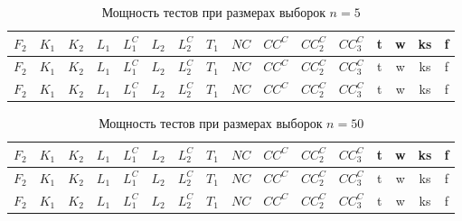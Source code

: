 \documentclass{article}
\begin{document}
\begin{longtable}{|c|c|c|c|c|c|c|c|c|c|c|c|c|c|c|c|}
  \caption{Мощность тестов при размерах выборок $n=5$}
  \label{table:n5} \\
  \hline
  $F_2$ & $K_{1}$ & $K_{2}$ & $L_{1}$ & $L_{1}^C$ & $L_{2}$ & $L_{2}^C$ & $T_1$ & $NC$ & $CC^C$ & $CC_2^C$ & $CC_3^C$ & t & w & ks & f \\ \hline
  
  
  
  
  $F_2$ & $K_{1}$ & $K_{2}$ & $L_{1}$ & $L_{1}^C$ & $L_{2}$ & $L_{2}^C$ & $T_1$ & $NC$ & $CC^C$ & $CC_2^C$ & $CC_3^C$ & t & w & ks & f \\ \hline
  
  
  
  
  $F_2$ & $K_{1}$ & $K_{2}$ & $L_{1}$ & $L_{1}^C$ & $L_{2}$ & $L_{2}^C$ & $T_1$ & $NC$ & $CC^C$ & $CC_2^C$ & $CC_3^C$ & t & w & ks & f \\ \hline
  
  
  
  
\end{longtable}

\begin{longtable}{|c|c|c|c|c|c|c|c|c|c|c|c|c|c|c|c|}
  \caption{Мощность тестов при размерах выборок $n=50$}
  \label{table:n50} \\
  \hline
  $F_2$ & $K_{1}$ & $K_{2}$ & $L_{1}$ & $L_{1}^C$ & $L_{2}$ & $L_{2}^C$ & $T_1$ & $NC$ & $CC^C$ & $CC_2^C$ & $CC_3^C$ & t & w & ks & f \\ \hline
  
  
  
  
  $F_2$ & $K_{1}$ & $K_{2}$ & $L_{1}$ & $L_{1}^C$ & $L_{2}$ & $L_{2}^C$ & $T_1$ & $NC$ & $CC^C$ & $CC_2^C$ & $CC_3^C$ & t & w & ks & f \\ \hline
  
  
  
  
  $F_2$ & $K_{1}$ & $K_{2}$ & $L_{1}$ & $L_{1}^C$ & $L_{2}$ & $L_{2}^C$ & $T_1$ & $NC$ & $CC^C$ & $CC_2^C$ & $CC_3^C$ & t & w & ks & f \\ \hline
  
  
  
  
\end{longtable}
\end{document}
